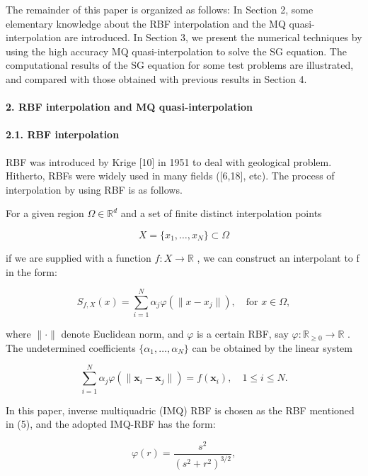 \documentclass[12pt]{article}
\begin{document}
The remainder of this paper is organized as follows: In Section 2, some elementary knowledge about the RBF interpolation and the MQ quasi-interpolation are introduced. In Section 3, we present the numerical techniques by using the high accuracy MQ quasi-interpolation to solve the SG equation. The computational results of the SG equation for some test problems are illustrated, and compared with those obtained with previous results in Section 4.

\hypertarget{rbf-interpolation-and-mq-quasi-interpolation}{%
\paragraph{2. RBF interpolation and MQ quasi-interpolation}\label{rbf-interpolation-and-mq-quasi-interpolation}}

\hypertarget{rbf-interpolation}{%
\paragraph{2.1. RBF interpolation}\label{rbf-interpolation}}

RBF was introduced by Krige {[}10{]} in 1951 to deal with geological problem. Hitherto, RBFs were widely used in many fields ({[}6,18{]}, etc). The process of interpolation by using RBF is as follows.

For a given region \(\Omega \in \mathbb{R}^d\) and a set of finite distinct interpolation points

\[X = \{x_1, \ldots, x_N\} \subset \Omega\]

if we are supplied with a function \(f: X \to \mathbb{R}\) , we can construct an interpolant to f in the form:

\[S_{f,X}(x) = \sum_{i=1}^{N} \alpha_j \varphi(\|x - x_j\|), \quad \text{for } x \in \Omega,\tag{5}\]

where \(\|\cdot\|\) denote Euclidean norm, and \(\varphi\) is a certain RBF, say \(\varphi:\mathbb{R}_{\geqslant 0}\to\mathbb{R}\) . The undetermined coefficients \(\{\alpha_1,\ldots,\alpha_N\}\) can be obtained by the linear system

\[\sum_{i=1}^{N} \alpha_j \varphi(\|\mathbf{x}_i - \mathbf{x}_j\|) = f(\mathbf{x}_i), \quad 1 \leqslant i \leqslant N.\tag{6}\]

In this paper, inverse multiquadric (IMQ) RBF is chosen as the RBF mentioned in (5), and the adopted IMQ-RBF has the form:

\[\varphi(r) = \frac{s^2}{(s^2 + r^2)^{3/2}},\tag{7}\]
\end{document}
